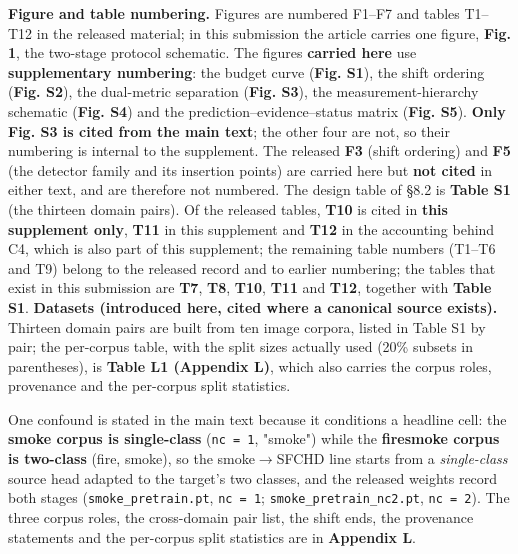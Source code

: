 \documentclass[pdflatex,sn-mathphys-ay]{sn-jnl}
\begin{document}
\textbf{Figure and table numbering.} Figures are numbered F1--F7 and tables T1--T12 in the released material; in this submission the article carries one figure, \textbf{Fig. 1}, the two-stage protocol schematic. The figures \textbf{carried here} use \textbf{supplementary numbering}: the budget curve (\textbf{Fig. S1}), the shift ordering (\textbf{Fig. S2}), the dual-metric separation (\textbf{Fig. S3}), the measurement-hierarchy schematic (\textbf{Fig. S4}) and the prediction--evidence--status matrix (\textbf{Fig. S5}). \textbf{Only Fig. S3 is cited from the main text}; the other four are not, so their numbering is internal to the supplement. The released \textbf{F3} (shift ordering) and \textbf{F5} (the detector family and its insertion points) are carried here but \textbf{not cited} in either text, and are therefore not numbered. The design table of \S{}8.2 is \textbf{Table S1} (the thirteen domain pairs). Of the released tables, \textbf{T10} is cited in \textbf{this supplement only}, \textbf{T11} in this supplement and \textbf{T12} in the accounting behind C4, which is also part of this supplement; the remaining table numbers (T1--T6 and T9) belong to the released record and to earlier numbering; the tables that exist in this submission are \textbf{T7}, \textbf{T8}, \textbf{T10}, \textbf{T11} and \textbf{T12}, together with \textbf{Table S1}. \textbf{Datasets (introduced here, cited where a canonical source exists).} Thirteen domain pairs are built from ten image corpora, listed in Table S1 by pair; the per-corpus table, with the split sizes actually used (20\% subsets in parentheses), is \textbf{Table L1 (Appendix L)}, which also carries the corpus roles, provenance and the per-corpus split statistics.

One confound is stated in the main text because it conditions a headline cell: the \textbf{smoke corpus is single-class} (\texttt{nc = 1}, "smoke") while the \textbf{firesmoke corpus is two-class} (fire, smoke), so the smoke\ensuremath{\rightarrow}SFCHD line starts from a \emph{single-class} source head adapted to the target's two classes, and the released weights record both stages (\texttt{smoke\_pretrain.pt}, \texttt{nc = 1}; \texttt{smoke\_pretrain\_nc2.pt}, \texttt{nc = 2}). The three corpus roles, the cross-domain pair list, the shift ends, the provenance statements and the per-corpus split statistics are in \textbf{Appendix L}.
\end{document}
